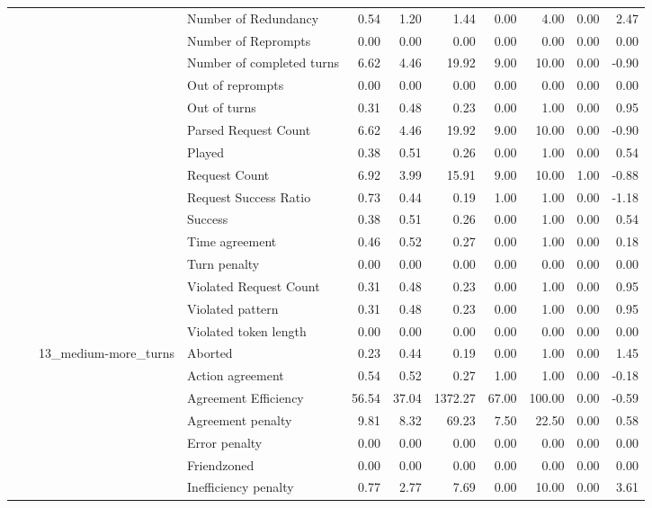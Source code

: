 \begin{tabular}{llllrrrrrrr}
 &  &  & Number of Redundancy & 0.54 & 1.20 & 1.44 & 0.00 & 4.00 & 0.00 & 2.47 \\
 &  &  & Number of Reprompts & 0.00 & 0.00 & 0.00 & 0.00 & 0.00 & 0.00 & 0.00 \\
 &  &  & Number of completed turns & 6.62 & 4.46 & 19.92 & 9.00 & 10.00 & 0.00 & -0.90 \\
 &  &  & Out of reprompts & 0.00 & 0.00 & 0.00 & 0.00 & 0.00 & 0.00 & 0.00 \\
 &  &  & Out of turns & 0.31 & 0.48 & 0.23 & 0.00 & 1.00 & 0.00 & 0.95 \\
 &  &  & Parsed Request Count & 6.62 & 4.46 & 19.92 & 9.00 & 10.00 & 0.00 & -0.90 \\
 &  &  & Played & 0.38 & 0.51 & 0.26 & 0.00 & 1.00 & 0.00 & 0.54 \\
 &  &  & Request Count & 6.92 & 3.99 & 15.91 & 9.00 & 10.00 & 1.00 & -0.88 \\
 &  &  & Request Success Ratio & 0.73 & 0.44 & 0.19 & 1.00 & 1.00 & 0.00 & -1.18 \\
 &  &  & Success & 0.38 & 0.51 & 0.26 & 0.00 & 1.00 & 0.00 & 0.54 \\
 &  &  & Time agreement & 0.46 & 0.52 & 0.27 & 0.00 & 1.00 & 0.00 & 0.18 \\
 &  &  & Turn penalty & 0.00 & 0.00 & 0.00 & 0.00 & 0.00 & 0.00 & 0.00 \\
 &  &  & Violated Request Count & 0.31 & 0.48 & 0.23 & 0.00 & 1.00 & 0.00 & 0.95 \\
 &  &  & Violated pattern & 0.31 & 0.48 & 0.23 & 0.00 & 1.00 & 0.00 & 0.95 \\
 &  &  & Violated token length & 0.00 & 0.00 & 0.00 & 0.00 & 0.00 & 0.00 & 0.00 \\
\cline{3-11}
 &  & \multirow[t]{27}{*}{13_medium-more_turns} & Aborted & 0.23 & 0.44 & 0.19 & 0.00 & 1.00 & 0.00 & 1.45 \\
 &  &  & Action agreement & 0.54 & 0.52 & 0.27 & 1.00 & 1.00 & 0.00 & -0.18 \\
 &  &  & Agreement Efficiency & 56.54 & 37.04 & 1372.27 & 67.00 & 100.00 & 0.00 & -0.59 \\
 &  &  & Agreement penalty & 9.81 & 8.32 & 69.23 & 7.50 & 22.50 & 0.00 & 0.58 \\
 &  &  & Error penalty & 0.00 & 0.00 & 0.00 & 0.00 & 0.00 & 0.00 & 0.00 \\
 &  &  & Friendzoned & 0.00 & 0.00 & 0.00 & 0.00 & 0.00 & 0.00 & 0.00 \\
 &  &  & Inefficiency penalty & 0.77 & 2.77 & 7.69 & 0.00 & 10.00 & 0.00 & 3.61 \\

\end{tabular}
